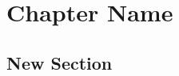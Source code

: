 \documentclass[class=book,crop=false]{standalone}
\begin{document}
\chapter{Chapter Name}
\section{New Section}
\end{document}
